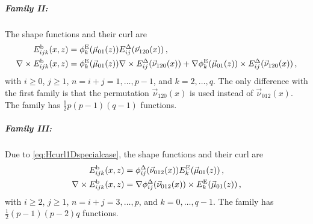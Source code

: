\subparagraph{Family II:}
The shape functions and their curl are
\begin{equation}
	\begin{aligned}	
		E_{ijk}^\mathrm{b}(x,z)&=\phi_k^{\mathrm{E}}(\vec{\mu}_{01}(z))E_{ij}^\Delta(\vec{\nu}_{120}(x))\,,\\
		\nabla\times E_{ijk}^\mathrm{b}(x,z)&=\phi_k^{\mathrm{E}}(\vec{\mu}_{01}(z))\nabla\times E_{ij}^\Delta(\vec{\nu}_{120}(x))
			+\nabla\phi_k^{\mathrm{E}}(\vec{\mu}_{01}(z))\times E_{ij}^\Delta(\vec{\nu}_{120}(x))\,,
	\end{aligned}
\end{equation}
with $i\geq0$, $j\geq1$, $n=i+j=1,\ldots,p-1$, and $k=2,\ldots,q$. 
The only difference with the first family is that the permutation $\vec{\nu}_{120}(x)$ is used instead of $\vec{\nu}_{012}(x)$.
The family has $\frac{1}{2}p(p-1)(q-1)$ functions.

\subparagraph{Family III:}
Due to \eqref{eq:Hcurl1Dspecialcase}, the shape functions and their curl are
\begin{equation}
	\begin{aligned}	
		E_{ijk}^\mathrm{b}(x,z)&=\phi_{ij}^\Delta(\vec{\nu}_{012}(x))E_k^{\mathrm{E}}(\vec{\mu}_{01}(z))\,,\\
		\nabla\times E_{ijk}^\mathrm{b}(x,z)&=\nabla\phi_{ij}^\Delta(\vec{\nu}_{012}(x))\times E_k^{\mathrm{E}}(\vec{\mu}_{01}(z))\,,
	\end{aligned}
\end{equation}
with $i\geq2$, $j\geq1$, $n=i+j=3,\ldots,p$, and $k=0,\ldots,q-1$. 
The family has $\frac{1}{2}(p-1)(p-2)q$ functions.

